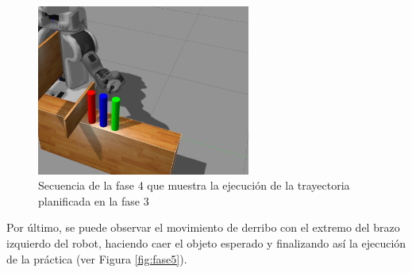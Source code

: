 \documentclass[12pt,spanish,chapterprefix, numbers=noenddot]{book}
\numberwithin{equation}{section}
\numberwithin{figure}{section}
\begin{document}
\begin{figure}[hbt!]
\includegraphics[width=7cm]{Figs/pos1_1.png}
\par
\caption{\label{fig:fase4}Secuencia de la fase 4 que muestra la ejecución de la trayectoria planificada en la fase 3}
\end{figure}

Por último, se puede observar el movimiento de derribo con el extremo del brazo izquierdo del robot, haciendo caer el objeto esperado y finalizando así la ejecución de la práctica (ver Figura \ref{fig:fase5}). 
\end{document}
